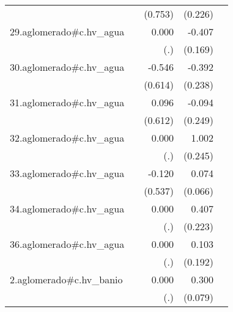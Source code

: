 {\begin{longtable}{l*{4}{D{.}{.}{-1}}}
            &                     &     (0.753)         &     (0.226)         &                     \\
\addlinespace
29.aglomerado#c.hv\_agua&                     &       0.000         &      -0.407\sym{*}  &                     \\
            &                     &         (.)         &     (0.169)         &                     \\
\addlinespace
30.aglomerado#c.hv\_agua&                     &      -0.546         &      -0.392         &                     \\
            &                     &     (0.614)         &     (0.238)         &                     \\
\addlinespace
31.aglomerado#c.hv\_agua&                     &       0.096         &      -0.094         &                     \\
            &                     &     (0.612)         &     (0.249)         &                     \\
\addlinespace
32.aglomerado#c.hv\_agua&                     &       0.000         &       1.002\sym{***}&                     \\
            &                     &         (.)         &     (0.245)         &                     \\
\addlinespace
33.aglomerado#c.hv\_agua&                     &      -0.120         &       0.074         &                     \\
            &                     &     (0.537)         &     (0.066)         &                     \\
\addlinespace
34.aglomerado#c.hv\_agua&                     &       0.000         &       0.407         &                     \\
            &                     &         (.)         &     (0.223)         &                     \\
\addlinespace
36.aglomerado#c.hv\_agua&                     &       0.000         &       0.103         &                     \\
            &                     &         (.)         &     (0.192)         &                     \\
\addlinespace
2.aglomerado#c.hv\_banio&                     &       0.000         &       0.300\sym{***}&                     \\
            &                     &         (.)         &     (0.079)         &                     \\

\end{longtable}}
